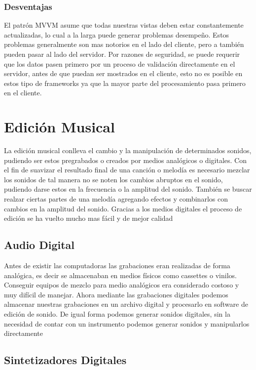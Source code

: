 \subsubsection{Desventajas}
El patrón MVVM asume que todas nuestras vistas deben estar constantemente
actualizadas, lo cual a la larga puede generar problemas desempeño. Estos
problemas generalmente son mas notorios en el lado del cliente, pero a también
pueden pasar al lado del servidor.
Por razones de seguridad, se puede requerir que los datos
pasen primero por un proceso de validación directamente en el servidor,
antes de que puedan ser mostrados en el cliente, esto no es posible en
estos tipo de frameworks ya que la mayor parte del procesamiento pasa
primero en el cliente.

\section{Edición Musical}

La edición musical conlleva el cambio y la manipulación de determinados
sonidos, pudiendo ser estos pregrabados o creados por medios analógicos
o digitales. Con el fin de suavizar el resultado final de una canción o
melodía es necesario mezclar los sonidos de tal manera no se noten los
cambios abruptos en el sonido, pudiendo darse estos en la frecuencia o
la amplitud del sonido. También se buscar realzar ciertas partes de una
melodía agregando efectos y combinarlos con cambios en la amplitud del sonido.
Gracias a los medios digitales el proceso de edición se ha vuelto mucho
mas fácil y de mejor calidad

\subsection{Audio Digital}

Antes de existir las computadoras las grabaciones eran realizadas de
forma analógica, es decir se almacenaban en medios físicos como cassettes
o vinilos.
Conseguir equipos de mezclo para medio analógicos era considerado costoso
y muy difícil de manejar. Ahora mediante las grabaciones digitales podemos
almacenar nuestras grabaciones en un archivo digital y procesarlo en
software de edición de sonido. De igual forma podemos generar sonidos
digitales, sin la necesidad de contar con un instrumento podemos generar
sonidos y manipularlos directamente

\subsection{Sintetizadores Digitales}


